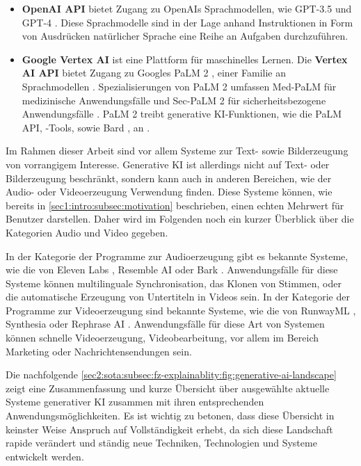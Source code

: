 \begin{itemize}
    \item \textbf{OpenAI API} bietet Zugang zu OpenAIs Sprachmodellen, wie GPT-3.5 \cite{openai-gpt-sep-2021} und GPT-4 \cite{openai-gpt-sep-2021}.
    Diese Sprachmodelle sind in der Lage anhand Instruktionen in Form von Ausdrücken natürlicher Sprache eine Reihe an Aufgaben durchzuführen.
    \item \textbf{Google Vertex AI} ist eine Plattform für maschinelles Lernen.
    Die \textbf{Vertex AI API} bietet Zugang zu Googles PaLM 2 \cite{google-palm2-techreport}, einer Familie an Sprachmodellen \cite{google-blog-io-23}.
    Spezialisierungen von PaLM 2 umfassen Med-PaLM für medizinische Anwendungsfälle und Sec-PaLM 2 für sicherheitsbezogene Anwendungsfälle \cite{google-blog-io-23}.
    PaLM 2 treibt generative KI-Funktionen, wie die PaLM API, -Tools, sowie Bard \cite{google-bard}, an \cite{google-blog-io-23}.
\end{itemize}

Im Rahmen dieser Arbeit sind vor allem Systeme zur Text- sowie Bilderzeugung von vorrangigem Interesse.
Generative KI ist allerdings nicht auf Text- oder Bilderzeugung beschränkt, sondern kann auch in anderen Bereichen, wie der Audio- oder Videoerzeugung Verwendung finden.
Diese Systeme können, wie bereits in \cref{sec1:intro:subsec:motivation} beschrieben, einen echten Mehrwert für Benutzer darstellen.
Daher wird im Folgenden noch ein kurzer Überblick über die Kategorien Audio und Video gegeben.

In der Kategorie der Programme zur Audioerzeugung gibt es bekannte Systeme, wie die von Eleven Labs \cite{eleven-labs}, Resemble AI \cite{resemble-ai} oder Bark \cite{bark}.
Anwendungsfälle für diese Systeme können multilinguale Synchronisation, das Klonen von Stimmen, oder die automatische Erzeugung von Untertiteln in Videos sein.
In der Kategorie der Programme zur Videoerzeugung sind bekannte Systeme, wie die von RunwayML \cite{runway-ml}, Synthesia \cite{synthesia} oder Rephrase AI \cite{rephrase-ai}.
Anwendungsfälle für diese Art von Systemen können schnelle Videoerzeugung, Videobearbeitung, vor allem im Bereich Marketing oder Nachrichtensendungen sein.

Die nachfolgende \cref{sec2:sota:subsec:fz-explainablity:fig:generative-ai-landscape} zeigt eine Zusammenfassung und kurze Übersicht über ausgewählte aktuelle Systeme generativer KI zusammen mit ihren entsprechenden Anwendungsmöglichkeiten.
Es ist wichtig zu betonen, dass diese Übersicht in keinster Weise Anspruch auf Vollständigkeit erhebt, da sich diese Landschaft rapide verändert und ständig neue Techniken, Technologien und Systeme entwickelt werden.

